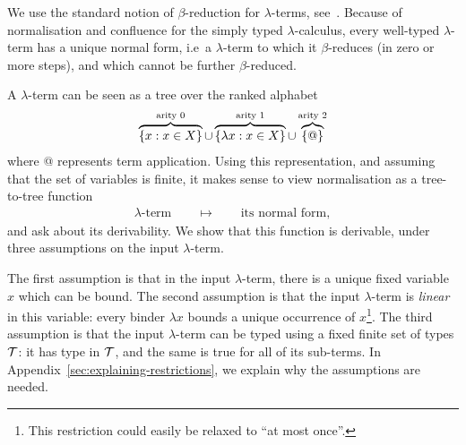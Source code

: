 We use the standard notion of $\beta$-reduction for $\lambda$-terms, see~\cite[Definition 1.2.1]{sorensen_lectures_2006}.  
Because of normalisation and confluence for the simply typed $\lambda$-calculus, every well-typed $\lambda$-term has a unique normal form, i.e~a $\lambda$-term to which it $\beta$-reduces (in zero or more steps), and which cannot be further $\beta$-reduced.

A $\lambda$-term  can be seen as a tree over the ranked alphabet
\begin{align}
    \label{eq:alphabet-for-lambda-terms}
  \overbrace{\{x : x \in X\}}^{\text{arity 0}} \cup \overbrace{\{\lambda x : x \in X\}}^{\text{arity 1}} \cup  \overbrace{\{@\}}^{\text{arity 2}}
\end{align}
where @ represents term application. Using this representation, and assuming that the set of variables is finite, it makes sense to view normalisation as a  tree-to-tree function
\begin{align*}
\text{$\lambda$-term} \qquad \mapsto \qquad \text{its normal form},
\end{align*}
and ask about its derivability.
 We show that this function is derivable, under three assumptions on the input $\lambda$-term. 
 
  The first assumption is that in the input $\lambda$-term, there is a unique fixed variable $x$ which can be bound. The second assumption is that the input $\lambda$-term is \emph{linear} in this variable: every binder $\lambda x$ bounds a unique occurrence of $x$\footnote{This restriction could easily be relaxed to ``at most once''.}.
     The third assumption is that  the input $\lambda$-term can be typed using a fixed finite set of types ${\mathcal T}$: it has type in ${\mathcal T}$, and the same is true for all of its  sub-terms.  In Appendix~\ref{sec:explaining-restrictions}, we explain why the  assumptions are needed.



